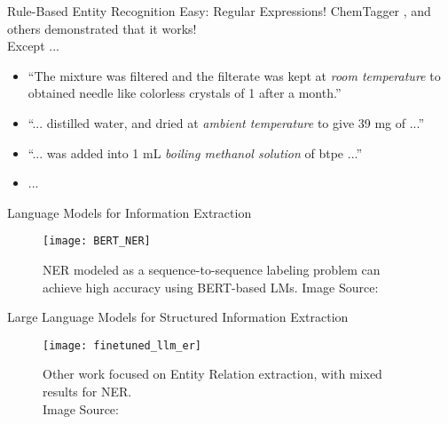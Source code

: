 \begin{frame}[c]{Rule-Based Entity Recognition}
    \large
    Easy: Regular Expressions! \pause
    ChemTagger \cite{hawizy_chemicaltagger_2011}, and others \cite{beard_comparative_2019, huang_database_2020} demonstrated that it works! \\
    \pause
    Except ...
    \begin{itemize}[<+(1)->]
        \item ``The mixture was filtered and the filterate was kept at \textit{room temperature} to obtained needle like colorless crystals of 1 after a month.'' \cite{vishnoi_flexible_2014}
        \item ``... distilled water, and dried at \textit{ambient temperature} to give 39 mg of ...'' \cite{lin_new_2005}
        \item ``... was added into 1 mL \textit{boiling methanol solution} of btpe ...'' \cite{wang_two_2012}
        \item ...
    \end{itemize}
\end{frame}


\begin{frame}[c]{Language Models for Information Extraction}
    \begin{figure}
        \texttt{[image: BERT\_NER]}
        \caption{
            \gls{NER} modeled as a sequence-to-sequence labeling problem can achieve high accuracy using \gls{BERT}-based
            \glspl{LM}. Image Source: \cite{zhao_finetuning_2021}
        }
    \end{figure}

\end{frame}

\begin{frame}[c]{Large Language Models for Structured Information Extraction}
    \begin{figure}
        \texttt{[image: finetuned\_llm\_er]}
        \caption{
            Other work focused on Entity Relation extraction, with mixed results for \gls{NER}. \\
            Image Source: \cite{dunn_structured_2022}
        }
    \end{figure}
\end{frame}

